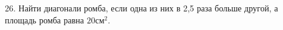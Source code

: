 26. Найти диагонали ромба, если одна из них в 2,5 раза больше другой, а площадь ромба равна $20\text{см}^2.$\\
